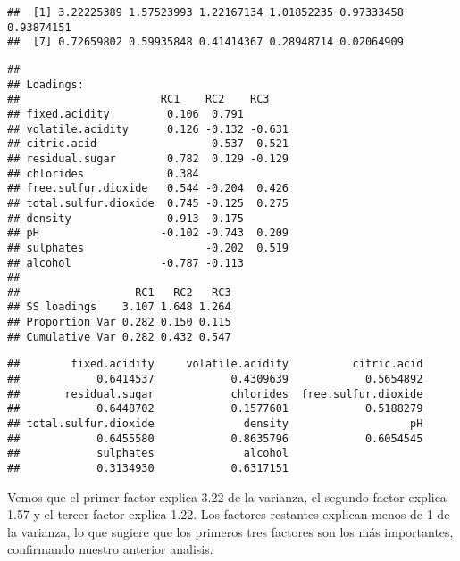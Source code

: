 \documentclass[
]{article}
\newenvironment{Shaded}{\begin{snugshade}}{\end{snugshade}}
\newcommand{\NormalTok}[1]{#1}
\newcommand{\SpecialCharTok}[1]{\textcolor[rgb]{0.81,0.36,0.00}{\textbf{#1}}}
\begin{document}
\begin{verbatim}
##  [1] 3.22225389 1.57523993 1.22167134 1.01852235 0.97333458 0.93874151
##  [7] 0.72659802 0.59935848 0.41414367 0.28948714 0.02064909
\end{verbatim}

\begin{Shaded}
\end{Shaded}

\begin{verbatim}
## 
## Loadings:
##                      RC1    RC2    RC3   
## fixed.acidity         0.106  0.791       
## volatile.acidity      0.126 -0.132 -0.631
## citric.acid                  0.537  0.521
## residual.sugar        0.782  0.129 -0.129
## chlorides             0.384              
## free.sulfur.dioxide   0.544 -0.204  0.426
## total.sulfur.dioxide  0.745 -0.125  0.275
## density               0.913  0.175       
## pH                   -0.102 -0.743  0.209
## sulphates                   -0.202  0.519
## alcohol              -0.787 -0.113       
## 
##                  RC1   RC2   RC3
## SS loadings    3.107 1.648 1.264
## Proportion Var 0.282 0.150 0.115
## Cumulative Var 0.282 0.432 0.547
\end{verbatim}

\begin{Shaded}
\end{Shaded}

\begin{verbatim}
##        fixed.acidity     volatile.acidity          citric.acid 
##            0.6414537            0.4309639            0.5654892 
##       residual.sugar            chlorides  free.sulfur.dioxide 
##            0.6448702            0.1577601            0.5188279 
## total.sulfur.dioxide              density                   pH 
##            0.6455580            0.8635796            0.6054545 
##            sulphates              alcohol 
##            0.3134930            0.6317151
\end{verbatim}

Vemos que el primer factor explica 3.22 de la varianza, el segundo
factor explica 1.57 y el tercer factor explica 1.22. Los factores
restantes explican menos de 1 de la varianza, lo que sugiere que los
primeros tres factores son los más importantes, confirmando nuestro
anterior analisis.
\end{document}
